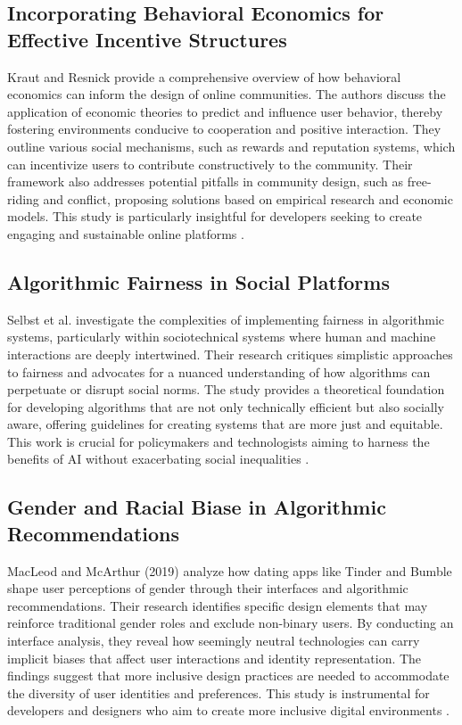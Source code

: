 \subsection{Incorporating Behavioral Economics for Effective Incentive Structures}
Kraut and Resnick provide a comprehensive overview of how behavioral economics can inform the design of online communities. The authors discuss the application of economic theories to predict and influence user behavior, thereby fostering environments conducive to cooperation and positive interaction. They outline various social mechanisms, such as rewards and reputation systems, which can incentivize users to contribute constructively to the community. Their framework also addresses potential pitfalls in community design, such as free-riding and conflict, proposing solutions based on empirical research and economic models. This study is particularly insightful for developers seeking to create engaging and sustainable online platforms \cite{Kraut_Resnick_2012}.

\subsection{Algorithmic Fairness in Social Platforms}
Selbst et al. investigate the complexities of implementing fairness in algorithmic systems, particularly within sociotechnical systems where human and machine interactions are deeply intertwined. Their research critiques simplistic approaches to fairness and advocates for a nuanced understanding of how algorithms can perpetuate or disrupt social norms. The study provides a theoretical foundation for developing algorithms that are not only technically efficient but also socially aware, offering guidelines for creating systems that are more just and equitable. This work is crucial for policymakers and technologists aiming to harness the benefits of AI without exacerbating social inequalities \cite{Selbst_Boyd_Friedler_Venkatasubramanian_Vertesi_2019}.

\subsection{Gender and Racial Biase in Algorithmic Recommendations}
MacLeod and McArthur (2019) analyze how dating apps like Tinder and Bumble shape user perceptions of gender through their interfaces and algorithmic recommendations. Their research identifies specific design elements that may reinforce traditional gender roles and exclude non-binary users. By conducting an interface analysis, they reveal how seemingly neutral technologies can carry implicit biases that affect user interactions and identity representation. The findings suggest that more inclusive design practices are needed to accommodate the diversity of user identities and preferences. This study is instrumental for developers and designers who aim to create more inclusive digital environments \cite{MacLeod_McArthur_2019}.

